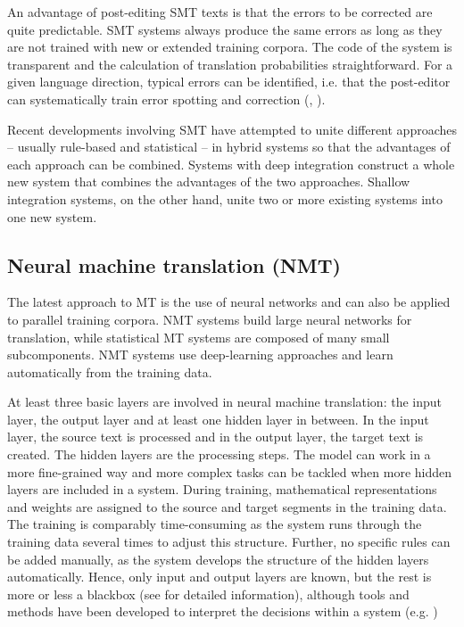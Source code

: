 An advantage of post-editing SMT texts is that the errors to be corrected are quite predictable. SMT systems always produce the same errors as long as they are not trained with new or extended training corpora. The code of the system is transparent and the calculation of translation probabilities straightforward. For a given language direction, typical errors can be identified, i.e. that the post-editor can systematically train error spotting and correction (\citealt{culo_influence_2014}, \citealt{nitzke2019problem}). 

Recent developments involving SMT have attempted to unite different approaches – usually rule-based and statistical – in hybrid systems so that the advantages of each approach can be combined. Systems with deep integration construct a whole new system that combines the advantages of the two approaches. Shallow integration systems, on the other hand, unite two or more existing systems into one new system.

\subsection{Neural machine translation (NMT)}\label{sec:3:2:3}

The latest approach to MT is the use of neural networks and can also be applied to parallel training corpora. NMT systems build large neural networks for translation, while statistical MT systems are composed of many small subcomponents. NMT systems use deep-learning approaches and learn automatically from the training data. 

At least three basic layers are involved in neural machine translation: the input layer, the output layer and at least one hidden layer in between. In the input layer, the source text is processed and in the output layer, the target text is created. The hidden layers are the processing steps. The model can work in a more fine-grained way and more complex tasks can be tackled when more hidden layers are included in a system. During training, mathematical representations and weights are assigned to the source and target segments in the training data. The training is comparably time-consuming as the system runs through the training data several times to adjust this structure. Further, no specific rules can be added manually, as the system develops the structure of the hidden layers automatically. Hence, only input and output layers are known, but the rest is more or less a blackbox (see \citealt{koehn2017neural} for detailed information), although tools and methods have been developed to interpret the decisions within a system (e.g. \citealt{vig2019bertviz})


